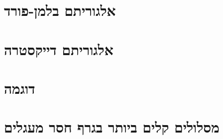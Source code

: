 \documentclass[]{article}
\begin{document}
	


\section*{אלגוריתם בלמן-פורד}

\section*{אלגוריתם דייקסטרה}

\section*{דוגמה}

\section*{מסלולים קלים ביותר בגרף חסר מעגלים}
\end{document}
